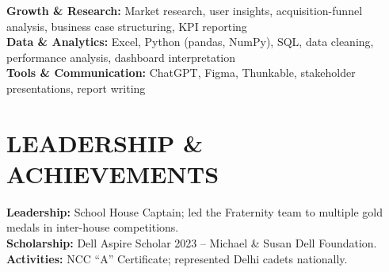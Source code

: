 \documentclass[10pt,a4paper]{article}
\begin{document}
\textbf{Growth \& Research:} Market research, user insights, acquisition-funnel
analysis, business case structuring, KPI reporting\\
\textbf{Data \& Analytics:} Excel, Python (pandas, NumPy), SQL, data cleaning,
performance analysis, dashboard interpretation\\
\textbf{Tools \& Communication:} ChatGPT, Figma, Thunkable, stakeholder
presentations, report writing


\section*{LEADERSHIP \& ACHIEVEMENTS}

{\fontsize{9.2pt}{10.2pt}\selectfont
\textbf{Leadership:} School House Captain; led the Fraternity team to multiple
gold medals in inter-house competitions.\\[-1pt]
\textbf{Scholarship:} Dell Aspire Scholar 2023 -- Michael \& Susan Dell
Foundation.\\[-1pt]
\textbf{Activities:} NCC ``A'' Certificate; represented Delhi cadets nationally.
}
\end{document}
